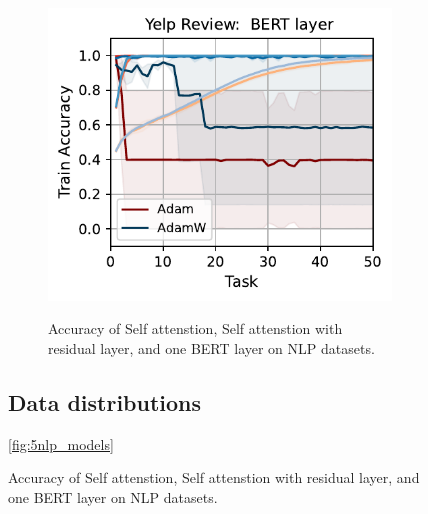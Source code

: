 \begin{figure}[htb!]
{\begin{figure}[t]
{        \includegraphics[width=\textwidth]{figs/Accuracy/nlp/bert_layer/yelp_review_full_40.pdf}
    }

    \caption{Accuracy of Self attenstion, Self attenstion with residual layer, and one BERT layer on NLP datasets.}
    \label{fig:nlp_self_res}
\end{figure}


\subsection{Data distributions}
\autoref{fig:5nlp_models}

}
\end{figure}
